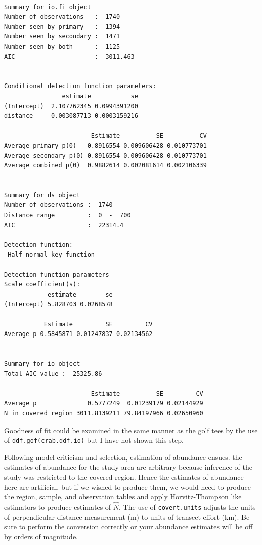 \documentclass[]{book}
\theoremstyle{definition}
\theoremstyle{definition}
\theoremstyle{remark}
\begin{document}
\begin{verbatim}

Summary for io.fi object 
Number of observations   :  1740 
Number seen by primary   :  1394 
Number seen by secondary :  1471 
Number seen by both      :  1125 
AIC                      :  3011.463 


Conditional detection function parameters:
                estimate           se
(Intercept)  2.107762345 0.0994391200
distance    -0.003087713 0.0003159216

                        Estimate          SE          CV
Average primary p(0)   0.8916554 0.009606428 0.010773701
Average secondary p(0) 0.8916554 0.009606428 0.010773701
Average combined p(0)  0.9882614 0.002081614 0.002106339


Summary for ds object 
Number of observations :  1740 
Distance range         :  0  -  700 
AIC                    :  22314.4 

Detection function:
 Half-normal key function 

Detection function parameters 
Scale coefficient(s):  
            estimate        se
(Intercept) 5.828703 0.0268578

           Estimate         SE         CV
Average p 0.5845871 0.01247837 0.02134562


Summary for io object
Total AIC value :  25325.86 

                        Estimate          SE         CV
Average p              0.5777249  0.01239179 0.02144929
N in covered region 3011.8139211 79.84197966 0.02650960
\end{verbatim}

Goodness of fit could be examined in the same manner as the golf tees by
the use of \texttt{ddf.gof(crab.ddf.io)} but I have not shown this step.

Following model criticism and selection, estimation of abundance ensues.
the estimates of abundance for the study area are arbitrary because
inference of the study was restricted to the covered region. Hence the
estimates of abundance here are artificial, but if we wished to produce
them, we would need to produce the region, sample, and observation
tables and apply Horvitz-Thompson like estimators to produce estimates
of \(\hat{N}\). The use of \texttt{covert.units} adjusts the units of
perpendicular distance measurement (m) to units of transect effort (km).
Be sure to perform the conversion correctly or your abundance estimates
will be off by orders of magnitude.
\end{document}
